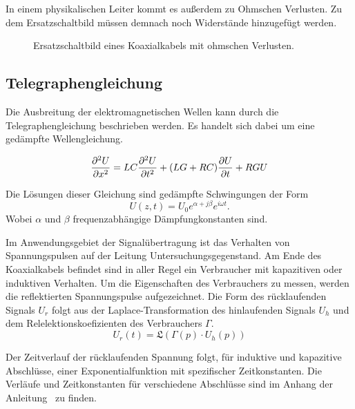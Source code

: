 In einem physikalischen Leiter kommt es außerdem zu Ohmschen Verlusten. Zu dem Ersatzschaltbild müssen demnach noch Widerstände hinzugefügt werden.
\begin{figure}
  \centering
  
  \caption{Ersatzschaltbild eines Koaxialkabels mit ohmschen Verlusten.}
  \label{fig:circuit_ohm}
\end{figure}


\subsection{Telegraphengleichung}
\label{ref:telegraph}
Die Ausbreitung der elektromagnetischen Wellen kann durch die Telegraphengleichung beschrieben werden.
Es handelt sich dabei um eine gedämpfte Wellengleichung.

\begin{equation}
  \label{eq:telegraph}
  \frac{\partial^2 U}{\partial x^2} = LC  \frac{\mathinner{\partial^2 U}}{\mathinner{\partial t^2} } + (LG + RC) \frac{\mathinner{\partial U}}{\mathinner{\partial t} } + RGU
\end{equation}

Die Lösungen dieser Gleichung sind gedämpfte Schwingungen der Form
\begin{equation}
  U(z, t) = U_0 e^{\alpha + j \beta} e^{i \omega t}.
\end{equation}
Wobei $\alpha$ und $\beta$ frequenzabhängige Dämpfungkonstanten sind.

Im Anwendungsgebiet der Signalübertragung ist das Verhalten von Spannungspulsen auf der Leitung Untersuchungsgegenstand.
Am Ende des Koaxialkabels befindet sind in aller Regel ein Verbraucher mit kapazitiven oder induktiven Verhalten.
Um die Eigenschaften des Verbrauchers zu messen, werden die reflektierten Spannungspulse aufgezeichnet.
Die Form des rücklaufenden Signals $U_r$ folgt aus der Laplace-Transformation des hinlaufenden Signals $U_h$ und dem
Relelektionskoefizienten des Verbrauchers $\Gamma$.
\begin{equation}
  U_r(t) = \mathfrak{L}(\Gamma(p) \cdot U_h(p))
\end{equation}

Der Zeitverlauf der rücklaufenden Spannung folgt, für induktive und kapazitive Abschlüsse, einer Exponentialfunktion
mit spezifischer Zeitkonstanten. Die Verläufe und Zeitkonstanten für verschiedene Abschlüsse sind im Anhang der
Anleitung~\cite{v52} zu finden.



